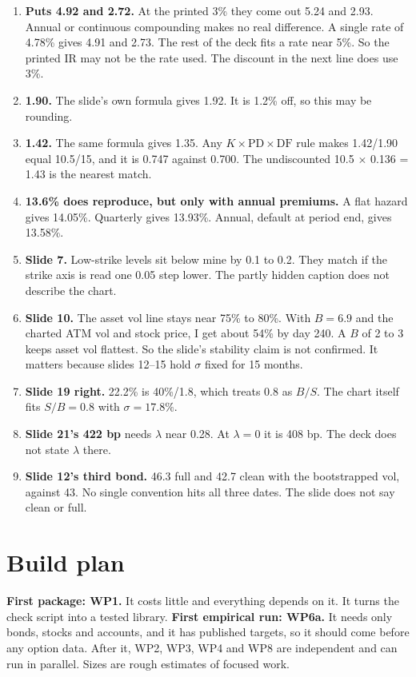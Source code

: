 \documentclass[10pt,a4paper]{article}
\newcommand{\DF}{\mathrm{DF}}
\begin{document}
\begin{enumerate}[nosep]
\item \textbf{Puts 4.92 and 2.72.} At the printed 3\% they come out 5.24 and 2.93. Annual or continuous compounding makes no real difference. A single rate of 4.78\% gives 4.91 and 2.73. The rest of the deck fits a rate near 5\%. So the printed IR may not be the rate used. The discount in the next line does use 3\%.
\item \textbf{1.90.} The slide's own formula gives 1.92. It is 1.2\% off, so this may be rounding.
\item \textbf{1.42.} The same formula gives 1.35. Any $K\times\mathrm{PD}\times\DF$ rule makes 1.42/1.90 equal 10.5/15, and it is 0.747 against 0.700. The undiscounted 10.5 $\times$ 0.136 = 1.43 is the nearest match.
\item \textbf{13.6\% does reproduce, but only with annual premiums.} A flat hazard gives 14.05\%. Quarterly gives 13.93\%. Annual, default at period end, gives 13.58\%.
\item \textbf{Slide 7.} Low-strike levels sit below mine by 0.1 to 0.2. They match if the strike axis is read one 0.05 step lower. The partly hidden caption does not describe the chart.
\item \textbf{Slide 10.} The asset vol line stays near 75\% to 80\%. With $B=6.9$ and the charted ATM vol and stock price, I get about 54\% by day 240. A $B$ of 2 to 3 keeps asset vol flattest. So the slide's stability claim is not confirmed. It matters because slides 12--15 hold $\sigma$ fixed for 15 months.
\item \textbf{Slide 19 right.} 22.2\% is 40\%/1.8, which treats 0.8 as $B/S$. The chart itself fits $S/B=0.8$ with $\sigma=17.8\%$.
\item \textbf{Slide 21's 422 bp} needs $\lambda$ near 0.28. At $\lambda=0$ it is 408 bp. The deck does not state $\lambda$ there.
\item \textbf{Slide 12's third bond.} 46.3 full and 42.7 clean with the bootstrapped vol, against 43. No single convention hits all three dates. The slide does not say clean or full.
\end{enumerate}

\section{Build plan}\label{sec:build}

\textbf{First package: WP1.} It costs little and everything depends on it. It turns the check script into a tested library. \textbf{First empirical run: WP6a.} It needs only bonds, stocks and accounts, and it has published targets, so it should come before any option data. After it, WP2, WP3, WP4 and WP8 are independent and can run in parallel. Sizes are rough estimates of focused work.
\end{document}
